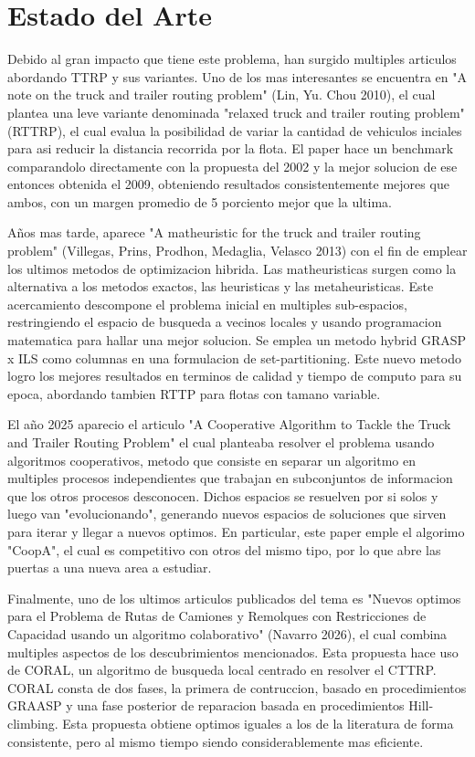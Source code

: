 \documentclass[letter, 10pt]{article}
\begin{document}
\section{Estado del Arte}
Debido al gran impacto que tiene este problema, han surgido multiples articulos abordando TTRP y sus variantes. Uno de los mas interesantes se encuentra
en "A note on the truck and trailer routing problem" (Lin, Yu. Chou 2010), el cual plantea una leve variante denominada "relaxed truck and trailer routing
problem" (RTTRP), el cual evalua la posibilidad de variar la cantidad de vehiculos inciales para asi reducir la distancia recorrida por la flota. El paper
hace un benchmark comparandolo directamente con la propuesta del 2002 y la mejor solucion de ese entonces obtenida el 2009, obteniendo resultados consistentemente
mejores que ambos, con un margen promedio de 5 porciento mejor que la ultima.

Años mas tarde, aparece "A matheuristic for the truck and trailer routing problem" (Villegas, Prins, Prodhon, Medaglia, Velasco 2013) con el fin de emplear
los ultimos metodos de optimizacion hibrida. Las matheuristicas surgen como la alternativa a los metodos exactos, las heuristicas y las metaheuristicas. Este
acercamiento descompone el problema inicial en multiples sub-espacios, restringiendo el espacio de busqueda a vecinos locales y usando programacion matematica
para hallar una mejor solucion. Se emplea un metodo hybrid GRASP x ILS como columnas en una formulacion de set-partitioning. Este nuevo metodo logro los mejores
resultados en terminos de calidad y tiempo de computo para su epoca, abordando tambien RTTP para flotas con tamano variable.

El año 2025 aparecio el articulo "A Cooperative Algorithm to Tackle the Truck and Trailer Routing Problem" el cual planteaba resolver el problema usando
algoritmos cooperativos, metodo que consiste en separar un algoritmo en multiples procesos independientes que trabajan en subconjuntos de informacion que
los otros procesos desconocen. Dichos espacios se resuelven por si solos y luego van "evolucionando", generando nuevos espacios de soluciones que sirven
para iterar y llegar a nuevos optimos. En particular, este paper emple el algorimo "CoopA", el cual es competitivo con otros del mismo tipo, por lo que
abre las puertas a una nueva area a estudiar.

Finalmente, uno de los ultimos articulos publicados del tema es "Nuevos optimos para el Problema de Rutas de Camiones y Remolques con Restricciones de Capacidad
usando un algoritmo colaborativo" (Navarro 2026), el cual combina multiples aspectos de los descubrimientos mencionados. Esta propuesta hace uso de CORAL, un algoritmo de busqueda
local centrado en resolver el CTTRP. CORAL consta de dos fases, la primera de contruccion, basado en procedimientos GRAASP y una fase posterior de reparacion basada
en procedimientos Hill-climbing. Esta propuesta obtiene optimos iguales a los de la literatura de forma consistente, pero al mismo tiempo siendo considerablemente
mas eficiente.
\end{document}
